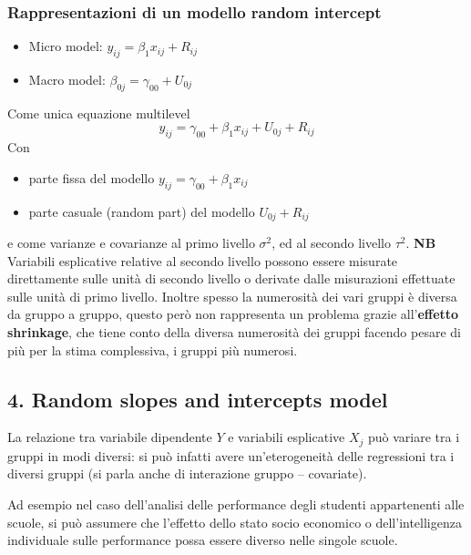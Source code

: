 \documentclass[a4page, 11pt]{article} %
\begin{document}
\subsubsection*{Rappresentazioni di un modello random intercept}
\begin{itemize}
\item Micro model: $y_{ij}=\beta_1 x_{ij}+R_{ij}$
\item Macro model: $\beta_{0j}=\gamma_{00}+U_{0j}$
\end{itemize}
Come unica equazione multilevel
\begin{equation*}
y_{ij}=\gamma_{00}+\beta_1 x_{ij}+ U_{0j}+R_{ij}
\end{equation*}
Con
\begin{itemize}
\item parte fissa del modello $y_{ij}=\gamma_{00}+\beta_1 x_{ij}$
\item parte casuale (random part) del modello $U_{0j}+ R_{ij}$
\end{itemize}
e come varianze e covarianze al primo livello $\sigma^2$, ed al secondo livello $\tau^2$.
\newline
\newline
\textbf{NB} Variabili esplicative relative al secondo livello possono essere misurate direttamente sulle unità di secondo livello o derivate dalle misurazioni effettuate sulle unità di primo livello. Inoltre spesso la numerosità dei vari gruppi è diversa da gruppo a gruppo, questo però non rappresenta un problema grazie all'\textbf{effetto shrinkage}, che tiene conto della diversa numerosità dei gruppi facendo pesare di più per la stima complessiva, i gruppi più numerosi. 
\subsection*{4. Random slopes and intercepts model} 
La relazione tra variabile dipendente $Y$ e variabili esplicative $X_j$ può variare tra i gruppi in modi diversi: si può infatti avere un’eterogeneità delle regressioni tra i diversi gruppi (si parla anche di interazione gruppo – covariate). 

Ad esempio nel caso dell’analisi delle performance degli studenti appartenenti alle scuole, si può assumere che l’effetto dello stato socio economico o dell’intelligenza individuale sulle performance possa essere diverso nelle singole scuole.
\end{document}
